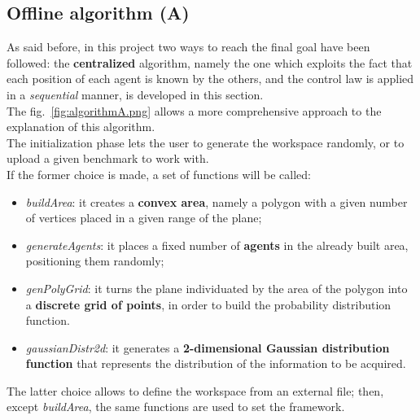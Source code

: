 \documentclass[a4paper,11pt,oneside]{book}
\begin{document}
	\subsection{Offline algorithm (A)}
	
	As said before, in this project two ways to reach the final goal have been followed: the \textbf{centralized} algorithm, namely the one which exploits the fact that each position of each agent is known by the others, and the control law is applied in a \textit{sequential} manner, is developed in this section.\\
The fig.~\ref{fig:algorithmA.png} allows a more comprehensive approach to the explanation of this algorithm.\\
The initialization phase lets the user to generate the workspace randomly, or to upload a given benchmark to work with. \\
If the former choice is made, a set of functions will be called:
 \begin{itemize}
		\item \textit{buildArea}: it creates a \textbf{convex area}, namely a polygon with a given number of vertices placed in a given range of the plane;
		\item \textit{generateAgents}: it places a fixed number of \textbf{agents} in the already built area, positioning them randomly;
		\item \textit{genPolyGrid}: it turns the plane individuated by the area of the polygon into a \textbf{discrete grid of points}, in order to build the probability distribution function.  
		\item \textit{gaussianDistr2d}: it generates a \textbf{2-dimensional Gaussian distribution function} that represents the distribution of the information to be acquired. 
\end {itemize}
The latter choice allows to define the workspace from an external file; then, except \textit{buildArea}, the same functions are used to set the framework.\\
\end{document}
